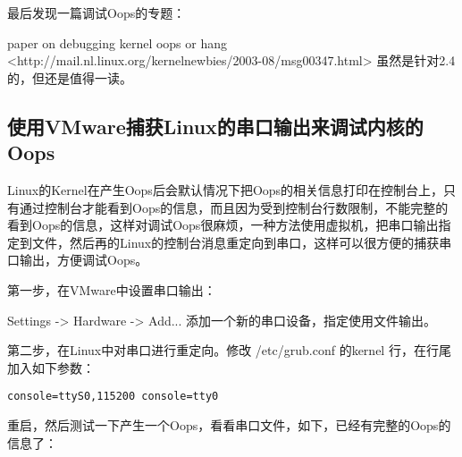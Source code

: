 

最后发现一篇调试Oops的专题：

paper on debugging kernel oops or hang　<http://mail.nl.linux.org/kernelnewbies/2003-08/msg00347.html> 虽然是针对2.4的，但还是值得一读。


\subsection{使用VMware捕获Linux的串口输出来调试内核的Oops}
Linux的Kernel在产生Oops后会默认情况下把Oops的相关信息打印在控制台上，只有通过控制台才能看到Oops的信息，而且因为受到控制台行数限制，不能完整的看到Oops的信息，这样对调试Oops很麻烦，一种方法使用虚拟机，把串口输出指定到文件，然后再的Linux的控制台消息重定向到串口，这样可以很方便的捕获串口输出，方便调试Oops。

第一步，在VMware中设置串口输出：

Settings -> Hardware -> Add... 添加一个新的串口设备，指定使用文件输出。

第二步，在Linux中对串口进行重定向。修改 /etc/grub.conf 的kernel 行，在行尾加入如下参数：

\begin{lstlisting}
console=ttyS0,115200 console=tty0
\end{lstlisting}

重启，然后测试一下产生一个Oops，看看串口文件，如下，已经有完整的Oops的信息了：

